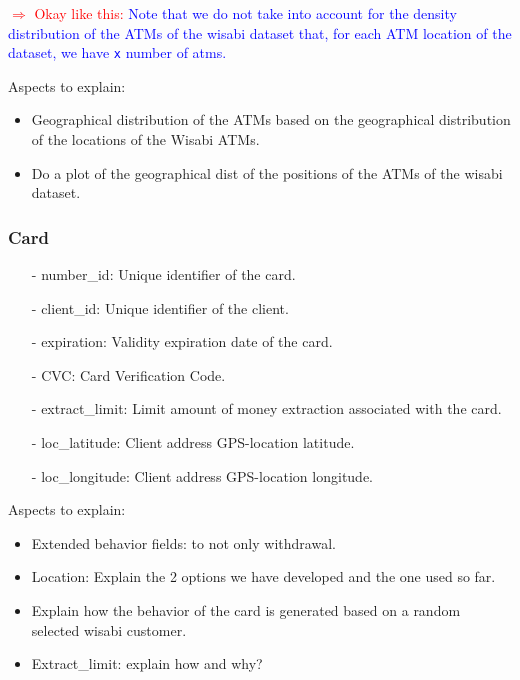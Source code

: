 \documentclass{article}
\begin{document}
\begin{tcolorbox}
\textcolor{red}{$\Rightarrow$ Okay like this: }
\textcolor{blue}{Note that we do not take into account for the density distribution of the 
ATMs of the wisabi dataset that, for each ATM location of the dataset, we have \texttt{x} 
number of atms.}

Aspects to explain:
\begin{itemize}
  \item Geographical distribution of the ATMs based on the geographical distribution 
  of the locations of the Wisabi ATMs.
  \item Do a plot of the geographical dist of the positions of the ATMs of the wisabi dataset.
\end{itemize}
\end{tcolorbox}

\subsubsection*{Card}

\begin{itemize}
\item[-] number\_id: Unique identifier of the card.
\item[-] client\_id: Unique identifier of the client.
\item[-] expiration: Validity expiration date of the card.
\item[-] CVC: Card Verification Code.
\item[-] extract\_limit: Limit amount of money extraction associated with the card.
\item[-] loc\_latitude: Client address GPS-location latitude.
\item[-] loc\_longitude: Client address GPS-location longitude.
\end{itemize}

\begin{tcolorbox}
  Aspects to explain:
  \begin{itemize}
    \item Extended behavior fields: to not only withdrawal.
    \item Location: Explain the 2 options we have developed and the one used so far.
    \item Explain how the behavior of the card is generated based on a random
    selected wisabi customer.
    \item Extract\_limit: explain how and why?
  \end{itemize}
\end{tcolorbox}
\end{document}
